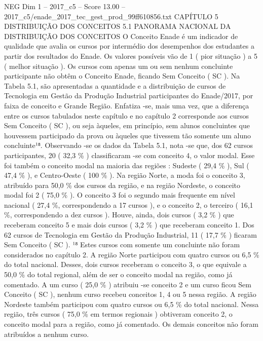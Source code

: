 \begin{textsample}{NEG Dim 1 – 2017\_c5 – Score 13.00 – 2017\_c5/enade\_2017\_tec\_gest\_prod\_99ff610856.txt}  \label{ex:f1_neg_382}
CAPÍTULO 5 DISTRIBUIÇÃO DOS CONCEITOS 5.1 PANORAMA NACIONAL DA DISTRIBUIÇÃO DOS CONCEITOS O Conceito Enade é um indicador de qualidade que avalia os cursos por intermédio dos desempenhos dos estudantes a partir dos resultados do Enade.
Os valores possíveis vão de 1 ( pior situação ) a 5 ( melhor situação ).
Os cursos com apenas um ou sem nenhum concluinte participante não obtêm o Conceito Enade, ficando Sem Conceito ( SC ).
Na Tabela 5.1, são apresentadas a quantidade e a distribuição de cursos de Tecnologia em Gestão da Produção Industrial participantes do Enade/2017, por faixa de conceito e Grande Região.
Enfatiza -se, mais uma vez, que a diferença entre os cursos tabulados neste capítulo e no capítulo 2 corresponde aos cursos Sem Conceito ( SC ), ou seja àqueles, em princípio, sem alunos concluintes que houvessem participado da prova ou àqueles que tivessem tão somente um aluno concluinte¹⁸.
Observando -se os dados da Tabela 5.1, nota -se que, dos 62 cursos participantes, 20 ( 32,3 \% ) classificaram -se com conceito 4, o valor modal.
Esse foi também o conceito modal na maioria das regiões : Sudeste ( 29,4 \% ), Sul ( 47,4 \% ), e Centro-Oeste ( 100 \% ).
Na região Norte, a moda foi o conceito 3, atribuído para 50,0 \% dos cursos da região, e na região Nordeste, o conceito modal foi 2 ( 75,0 \% ).
O conceito 3 foi o segundo mais frequente em nível nacional ( 27,4 \%, correspondendo a 17 cursos ), e o conceito 2, o terceiro ( 16,1 \%, correspondendo a dez cursos ).
Houve, ainda, dois cursos ( 3,2 \% ) que receberam conceito 5 e mais dois cursos ( 3,2 \% ) que receberam conceito 1.
Dos 62 cursos de Tecnologia em Gestão da Produção Industrial, 11 ( 17,7 \% ) ficaram Sem Conceito ( SC ). ¹⁸ Estes cursos com somente um concluinte não foram considerados no capítulo 2.
A região Norte participou com quatro cursos ou 6,5 \% do total nacional.
Desses, dois cursos receberam o conceito 3, o que equivale a 50,0 \% do total regional, além de ser o conceito modal na região, como já comentado.
A um curso ( 25,0 \% ) atribuiu -se conceito 2 e um curso ficou Sem Conceito ( SC ), nenhum curso recebeu conceitos 1, 4 ou 5 nessa região.
A região Nordeste também participou com quatro cursos ou 6,5 \% do total nacional.
Nessa região, três cursos ( 75,0 \% em termos regionais ) obtiveram conceito 2, o conceito modal para a região, como já comentado.
Os demais conceitos não foram atribuídos a nenhum curso.

\end{textsample}
